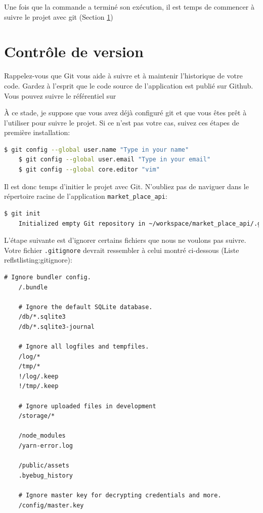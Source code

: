 \documentclass[]{report}
\begin{document}
        Une fois que la commande a terminé son exécution, il est temps de commencer à suivre le projet avec git (Section \ref{section:git})

  \section{Contrôle de version}\label{section:git}

    Rappelez-vous que Git vous aide à suivre et à maintenir l'historique de votre code. Gardez à l'esprit que le code source de l'application est publié sur Github. Vous pouvez suivre le référentiel sur %

    À ce stade, je suppose que vous avez déjà configuré git et que vous êtes prêt à l'utiliser pour suivre le projet. Si ce n'est pas votre cas, suivez ces étapes de première installation:

    \begin{scriptsize}
    \begin{lstlisting}[language=bash, breaklines]
    $ git config --global user.name "Type in your name"
    $ git config --global user.email "Type in your email"
    $ git config --global core.editor "vim"
    \end{lstlisting}
    \end{scriptsize}

    Il est donc temps d'initier le projet avec Git. N'oubliez pas de naviguer dans le répertoire racine de l'application \verb|market_place_api|:

    \begin{scriptsize}
    \begin{lstlisting}[language=bash, breaklines]
    $ git init
    Initialized empty Git repository in ~/workspace/market_place_api/.git/
    \end{lstlisting}
    \end{scriptsize}

    L'étape suivante est d'ignorer certains fichiers que nous ne voulons pas suivre. Votre fichier \verb|.gitignore| devrait ressembler à celui montré ci-dessous (Liste ref{lstlisting:gitignore}):

    \begin{scriptsize}
    \begin{lstlisting}[breaklines, caption={La version modifiée du fichier .gitignore}, label={lstlisting:gitignore}]
    # Ignore bundler config.
    /.bundle

    # Ignore the default SQLite database.
    /db/*.sqlite3
    /db/*.sqlite3-journal

    # Ignore all logfiles and tempfiles.
    /log/*
    /tmp/*
    !/log/.keep
    !/tmp/.keep

    # Ignore uploaded files in development
    /storage/*

    /node_modules
    /yarn-error.log

    /public/assets
    .byebug_history

    # Ignore master key for decrypting credentials and more.
    /config/master.key
    \end{lstlisting}
    \end{scriptsize}
\end{document}
